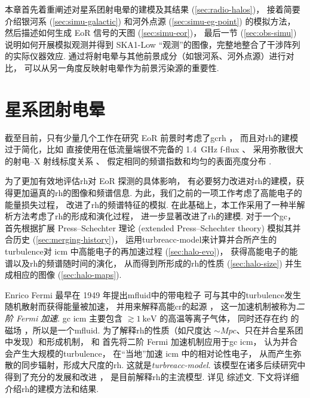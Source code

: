 本章首先着重阐述对星系团射电晕的建模及其结果 (\autoref{sec:radio-halos})，
接着简要介绍银河系 (\autoref{sec:simu-galactic})
和河外点源 (\autoref{sec:simu-eg-point}) 的模拟方法，
然后描述如何生成 EoR 信号的天图 (\autoref{sec:simu-eor})，
最后一节 (\autoref{sec:obs-simu}) 说明如何开展模拟观测并得到
SKA1-Low \enquote{观测}的图像，完整地整合了干涉阵列的实际仪器效应.
通过将射电晕与其他前景成分（如银河系、河外点源）进行对比，
可以从另一角度反映射电晕作为前景污染源的重要性.


\section{星系团射电晕}
\label{sec:radio-halos}

截至目前，只有少量几个工作在研究 EoR 前景时考虑了\ac{gc}\ac{rh}
\cite{diMatteo2004,gleser2008,jelic2008}，
而且对\ac{rh}的建模过于简化，比如
直接使用在低流量端很不完备的 \SI{1.4}{\GHz} \ac{f-flux} \cite{gleser2008}、
采用弥散很大的射电--X 射线标度关系 \cite{jelic2008}、
假定相同的频谱指数和均匀的表面亮度分布 \cite{gleser2008,jelic2008}.

为了更加有效地评估\ac{rh}对 EoR 探测的具体影响，
有必要努力改进对\ac{rh}的建模，获得更加逼真的\ac{rh}的图像和频谱信息.
为此，我们之前的一项工作\cite{wang2010}考虑了高能电子的能量损失过程，
改进了\ac{rh}的频谱特征的模拟.
在此基础上，本工作采用了一种半解析方法考虑了\ac{rh}的形成和演化过程，
进一步显著改进了\ac{rh}的建模.
对于一个\ac{gc}，
首先根据扩展 Press--Schechter 理论 (extended Press--Schechter theory)
模拟其并合历史 (\autoref{sec:merging-history})，
运用\ac{turbreacc-model}来计算并合所产生的\ac{turbulence}对
\ac{icm} 中高能电子的再加速过程 (\autoref{sec:halo-evo})，
获得高能电子的能谱以及\ac{rh}的频谱随时间的演化，
从而得到所形成的\ac{rh}的性质 (\autoref{sec:halo-size})
并生成相应的图像 (\autoref{sec:halo-maps}).

Enrico Fermi 最早在 1949 年提出\ac{mfluid}中的带电粒子
可与其中的\ac{turbulence}发生随机散射而获得能量被加速，
并用来解释高能\ac{cr}的起源 \cite{fermi1949,fermi1954,davis1956}，
这一加速机制被称为\emph{二阶 Fermi 加速}.
\ac{gc} \ac{icm} 主要包含 $\gtrsim \SI{1}{\keV}$ 的高温等离子气体，
同时还存在约 \si{\uG} 的磁场 \cite{govoni2004,ryu2008}，所以是一个\ac{mfluid}.
为了解释\ac{rh}的性质（如尺度达 $\sim\si{Mpc}$、只在并合星系团中发现）和形成机制，
 和 
首先将二阶 Fermi 加速机制应用于\ac{gc} \ac{icm}，
认为并合会产生大规模的\ac{turbulence}，
在\enquote{当地}加速 \ac{icm} 中的相对论性电子，
从而产生弥散的同步辐射，形成大尺度的\ac{rh}.
这就是\emph{\ac{turbreacc-model}}.
该模型在诸多后续研究中得到了充分的发展和改进
\cite{fujita2003,brunetti2004,cassano2005,brunetti2007,brunetti2011}，
是目前解释\ac{rh}的主流模型.
详见  综述文.
下文将详细介绍\ac{rh}的建模方法和结果.

